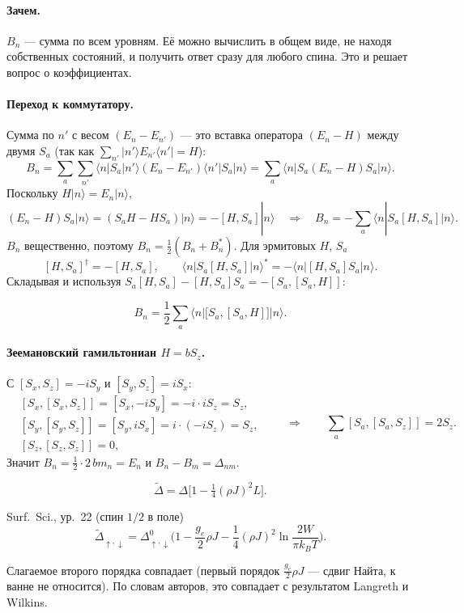 \paragraph{Зачем.} $B_n$ --- сумма по всем уровням. Её можно вычислить в общем
виде, не находя собственных состояний, и получить ответ сразу для любого
спина. Это и решает вопрос о коэффициентах.

\paragraph{Переход к коммутатору.} Сумма по $n'$ с весом $(E_n-E_{n'})$ --- это
вставка оператора $(E_n-H)$ между двумя $S_a$ (так как $\sum_{n'}|n'\rangle E_{n'}\langle n'|=H$):
\[
B_n=\sum_a\sum_{n'}\langle n|S_a|n'\rangle(E_n-E_{n'})\langle n'|S_a|n\rangle
=\sum_a\langle n|S_a(E_n-H)S_a|n\rangle .
\]
Поскольку $H|n\rangle=E_n|n\rangle$,
\[
(E_n-H)S_a|n\rangle=(S_aH-HS_a)|n\rangle=-[H,S_a]|n\rangle
\quad\Rightarrow\quad
B_n=-\sum_a\langle n|S_a[H,S_a]|n\rangle .
\]
$B_n$ вещественно, поэтому $B_n=\tfrac12(B_n+B_n^*)$. Для эрмитовых $H$, $S_a$
\[
[H,S_a]^\dagger=-[H,S_a],\qquad
\langle n|S_a[H,S_a]|n\rangle^*=-\langle n|[H,S_a]S_a|n\rangle .
\]
Складывая и используя $S_a[H,S_a]-[H,S_a]S_a=-[S_a,[S_a,H]]$:
\begin{resbox}
\begin{equation}
B_n=\frac12\sum_a\langle n|\big[S_a,[S_a,H]\big]|n\rangle .
\label{eq:kd_Bn}
\end{equation}
\end{resbox}

\paragraph{Зеемановский гамильтониан $H=bS_z$.} С $[S_x,S_z]=-iS_y$ и $[S_y,S_z]=iS_x$:
\[
\begin{aligned}
&[S_x,[S_x,S_z]]=[S_x,-iS_y]=-i\cdot iS_z=S_z,\\
&[S_y,[S_y,S_z]]=[S_y,iS_x]=i\cdot(-iS_z)=S_z,\\
&[S_z,[S_z,S_z]]=0,
\end{aligned}
\qquad\Rightarrow\qquad \sum_a[S_a,[S_a,S_z]]=2S_z .
\]
Значит $B_n=\tfrac12\cdot2\,bm_n=E_n$ и $B_n-B_m=\Delta_{nm}$.
\begin{resbox}
\[
\tilde\Delta=\Delta\Big[1-\tfrac14(\rho J)^2L\Big].
\]
\end{resbox}
\begin{paperbox}{Surf.\ Sci., ур.~22 (спин $1/2$ в поле)}
\[
\tilde\Delta_{\uparrow,\downarrow}=\Delta^0_{\uparrow,\downarrow}\Big(1-\frac{g_e}{2}\rho J-\frac14(\rho J)^2\ln\frac{2W}{\pi k_BT}\Big).
\]
\end{paperbox}
\begin{cmpbox}
Слагаемое второго порядка совпадает (первый порядок $\tfrac{g_e}2\rho J$ --- сдвиг
Найта, к ванне не относится). По словам авторов, это совпадает с
результатом Langreth и Wilkins.
\end{cmpbox}

